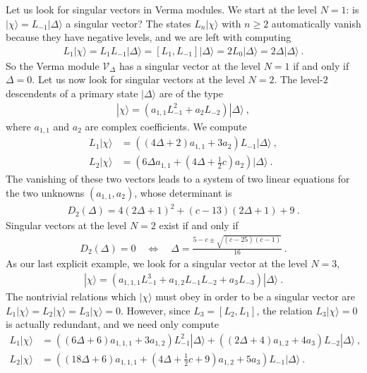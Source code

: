 \documentclass[12pt,a4paper,notitlepage]{report}
\numberwithin{equation}{section}
\theoremstyle{break}
\begin{document}
Let us look for singular vectors in Verma modules.
We start at the level $N=1$: is $|\chi\rangle=L_{-1}|\Delta\rangle$ a singular vector? The states $L_n|\chi\rangle$ with $n\geq 2$ automatically vanish because they have negative levels, and we are left with computing
\begin{align}
 L_1|\chi\rangle = L_1 L_{-1}|\Delta\rangle = [L_1,L_{-1}]|\Delta\rangle = 2L_0 |\Delta\rangle = 2\Delta|\Delta\rangle\ .
\end{align}
So the Verma module $\mathcal{V}_\Delta$ has a singular vector at the level $N=1$ if and only if $\Delta = 0$.
Let us now look for singular vectors at the level $N=2$.
The level-$2$ descendents of a primary state $|\Delta\rangle$ are of the type
\begin{align}
 |\chi\rangle = \left(a_{1,1} L_{-1}^2 + a_2 L_{-2}\right) |\Delta\rangle\ ,
\end{align}
where $a_{1,1}$ and $a_2$ are complex coefficients.
We compute 
\begin{align}
 L_1|\chi\rangle &= \left((4\Delta+2)a_{1,1} + 3a_2\right) L_{-1}|\Delta\rangle\ ,
\\
L_2 |\chi \rangle &= \left(6\Delta a_{1,1}+(4\Delta+\tfrac12 c) a_2\right)|\Delta\rangle\ .
\end{align}
The vanishing of these two vectors leads to a system of two linear equations for the two unknowns $(a_{1,1},a_2)$, whose determinant is 
\begin{align}
 D_2(\Delta) = 4(2\Delta+1)^2 +(c-13)(2\Delta+1) +9\ . 
\label{dud}
\end{align}
Singular vectors at the level $N=2$ exist if and only if
\begin{align}
D_2(\Delta)=0 \quad \Leftrightarrow \quad \Delta = \frac{5-c\pm \sqrt{(c-25)(c-1)}}{16}\ .
\label{dcscc}
\end{align}
As our last explicit example, we look for a singular vector at the level $N=3$,
\begin{align}
 |\chi\rangle = \left(a_{1,1,1} L_{-1}^3 + a_{1,2}L_{-1}L_{-2} + a_3 L_{-3}\right) |\Delta\rangle\ .
\end{align}
The nontrivial relations which $|\chi\rangle$ must obey in order to be a singular vector are $L_1|\chi\rangle =L_2|\chi\rangle= L_3 |\chi\rangle=0$.
However, since $L_3 = [L_2,L_1]$, the relation $L_3|\chi\rangle=0$ is actually redundant, and we need only compute
\begin{align}
 L_1|\chi\rangle &= \left((6\Delta+6)a_{1,1,1}+3a_{1,2}\right)L_{-1}^2|\Delta\rangle +\left((2\Delta+4)a_{1,2}+4a_3\right)L_{-2}|\Delta\rangle\ ,
\\
L_2|\chi\rangle &= \left((18\Delta+6)a_{1,1,1}+(4\Delta+\tfrac12c +9)a_{1,2}+5a_3\right)L_{-1}|\Delta\rangle\ .
\end{align}
\end{document}
